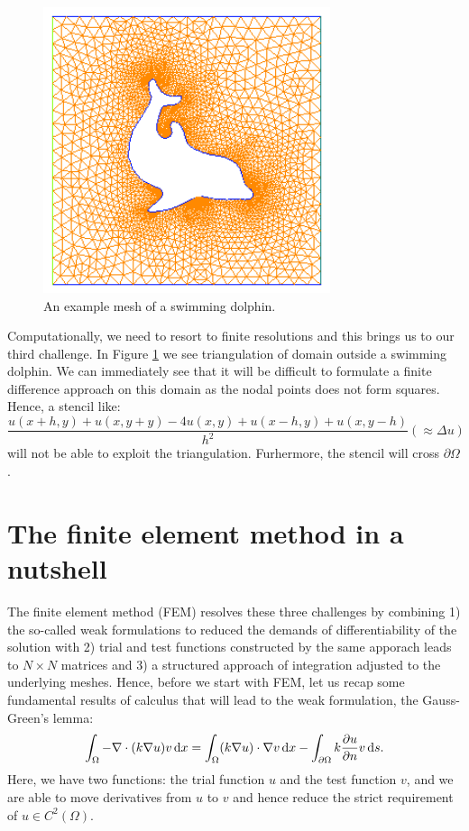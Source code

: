 \begin{figure}
\begin{center}
\includegraphics[width=0.75\textwidth]{chapters/elliptic/pics/dolfin_mesh_crop.png}
\caption{An example mesh of a swimming dolphin.}
\label{fig:dolphin}
\end{center}
\end{figure}



Computationally, we need to resort to finite resolutions and this brings us to our third 
challenge. In Figure \ref{fig:dolphin} we see triangulation of domain outside a swimming dolphin. We
can immediately see that it will be difficult to formulate a finite difference approach on this domain
as the nodal points does not form squares. Hence, a stencil like: 
\[
	\frac{u(x+h,y) + u(x,y+y) -4 u(x,y) + u(x-h,y) + u(x, y-h) }{h^2} (\approx \Delta u) 
\]
will not be able to exploit the triangulation. Furhermore, the stencil will cross $\partial \Omega$.   


\section{The finite element method in a nutshell}

The finite element method (FEM) resolves these three challenges by combining 1) the so-called weak formulations
to reduced the demands of differentiability of the solution with 2) 
trial and test functions constructed by the same apporach leads to $N\times N$ matrices and 3)  
a structured approach of integration
adjusted to the underlying meshes. Hence, before we start with FEM, let us recap some fundamental results of calculus that will lead to the weak formulation, the 
Gauss-Green's lemma: 
\begin{equation}
\label{gaussgreen}
\int_\Omega 
-\nabla\cdot(k\nabla u) v \, \mathrm{d}x =  
\int_\Omega (k\nabla u) \cdot \nabla v \, \mathrm{d}x  - \int_{\partial \Omega} k\frac{\partial u} {\partial n} v  \, \mathrm{d}s .  
\end{equation}
Here, we have two functions: the trial function $u$ and the test function $v$, and we are able to move derivatives from $u$ to $v$ and hence reduce the 
strict requirement of $u\in C^2(\Omega)$. 


